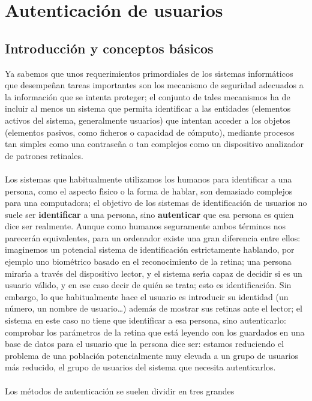 \chapter{Autenticaci\'on de usuarios}
\label{auth}
\section{Introducci\'on y conceptos b\'asicos}
Ya sabemos que unos requerimientos primordiales de los sistemas inform\'aticos 
que desempe\~nan tareas importantes son los mecanismo de seguridad adecuados a 
la informaci\'on que se intenta proteger; el conjunto de tales mecanismos ha 
de incluir al menos un sistema que permita identificar a las entidades 
(elementos activos del sistema, generalmente usuarios) que intentan acceder a 
los objetos (elementos pasivos, como ficheros o capacidad de c\'omputo), 
mediante procesos tan simples como una contrase\~na o tan complejos como un 
dispositivo analizador de patrones retinales.\\
\\Los sistemas que habitualmente utilizamos los humanos para identificar a una
persona, como el aspecto f\'{\i}sico o la forma de hablar, son demasiado 
complejos para una computadora; el objetivo de los sistemas de identificaci\'on 
de usuarios no suele ser {\bf identificar} a una persona, sino {\bf autenticar} 
que esa persona es quien dice ser realmente. Aunque como humanos seguramente 
ambos t\'erminos nos parecer\'an equivalentes, para un ordenador existe una 
gran diferencia entre ellos:
imaginemos un potencial sistema de identificaci\'on estrictamente hablando, por 
ejemplo uno biom\'etrico basado en el reconocimiento de la retina; una persona 
mirar\'{\i}a a trav\'es del dispositivo lector, y el sistema ser\'{\i}a capaz 
de decidir si es un usuario v\'alido, y en ese caso decir de qui\'en se trata;
esto es identificaci\'on. Sin embargo, lo que habitualmente hace el usuario es
introducir su identidad (un n\'umero, un nombre de usuario\ldots) adem\'as de
mostrar sus retinas ante el lector; el sistema en este caso no tiene que 
identificar a esa persona, sino autenticarlo: comprobar los par\'ametros de la 
retina que 
est\'a leyendo con los guardados en una base de datos para el usuario que la
persona dice ser: estamos reduciendo el problema de una poblaci\'on 
potencialmente muy elevada a un grupo de usuarios m\'as reducido, el grupo de 
usuarios del sistema que necesita autenticarlos.\\
\\Los m\'etodos de autenticaci\'on se suelen dividir en tres grandes 
